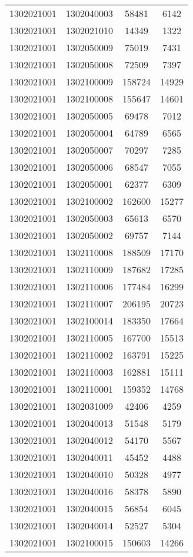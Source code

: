 \begin{longtable}[h]{llcc}
		1302021001 & 1302040003 & 58481 & 6142\\
		1302021001 & 1302021010 & 14349 & 1322\\
		1302021001 & 1302050009 & 75019 & 7431\\
		1302021001 & 1302050008 & 72509 & 7397\\
		1302021001 & 1302100009 & 158724 & 14929\\
		1302021001 & 1302100008 & 155647 & 14601\\
		1302021001 & 1302050005 & 69478 & 7012\\
		1302021001 & 1302050004 & 64789 & 6565\\
		1302021001 & 1302050007 & 70297 & 7285\\
		1302021001 & 1302050006 & 68547 & 7055\\
		1302021001 & 1302050001 & 62377 & 6309\\
		1302021001 & 1302100002 & 162600 & 15277\\
		1302021001 & 1302050003 & 65613 & 6570\\
		1302021001 & 1302050002 & 69757 & 7144\\
		1302021001 & 1302110008 & 188509 & 17170\\
		1302021001 & 1302110009 & 187682 & 17285\\
		1302021001 & 1302110006 & 177484 & 16299\\
		1302021001 & 1302110007 & 206195 & 20723\\
		1302021001 & 1302100014 & 183350 & 17664\\
		1302021001 & 1302110005 & 167700 & 15513\\
		1302021001 & 1302110002 & 163791 & 15225\\
		1302021001 & 1302110003 & 162881 & 15111\\
		1302021001 & 1302110001 & 159352 & 14768\\
		1302021001 & 1302031009 & 42406 & 4259\\
		1302021001 & 1302040013 & 51548 & 5179\\
		1302021001 & 1302040012 & 54170 & 5567\\
		1302021001 & 1302040011 & 45452 & 4488\\
		1302021001 & 1302040010 & 50328 & 4977\\
		1302021001 & 1302040016 & 58378 & 5890\\
		1302021001 & 1302040015 & 56854 & 6045\\
		1302021001 & 1302040014 & 52527 & 5304\\
		1302021001 & 1302100015 & 150603 & 14266\\

\end{longtable}
